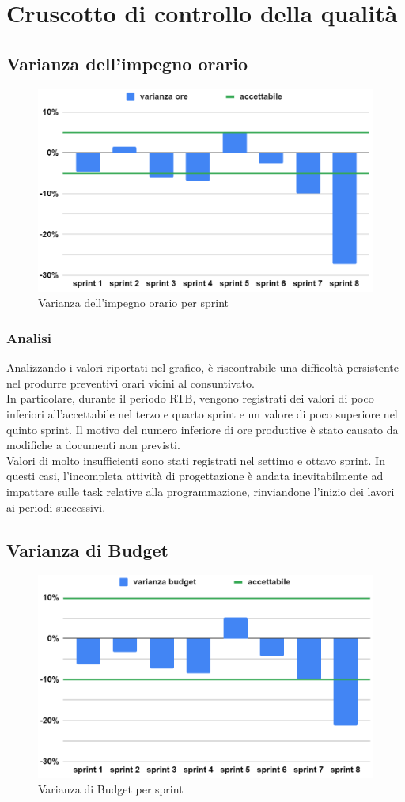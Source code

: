 \chapter{Cruscotto di controllo della qualità} \label{sec:cruscotto}

\section{Varianza dell'impegno orario}
\begin{figure}[H]
    \centering
    \includegraphics[width=0.8\linewidth]{VarOre.png}
    \caption{Varianza dell'impegno orario per sprint}
\end{figure}
\subsection{Analisi}
Analizzando i valori riportati nel grafico, è riscontrabile una difficoltà persistente nel produrre preventivi orari vicini al consuntivato.\\
In particolare, durante il periodo RTB, vengono registrati dei valori di poco inferiori all'accettabile nel terzo e quarto sprint e un valore di poco superiore nel quinto sprint. Il motivo del numero inferiore di ore produttive è stato causato da modifiche a documenti non previsti.\\
Valori di molto insufficienti sono stati registrati nel settimo e ottavo sprint. In questi casi, l'incompleta attività di progettazione è andata inevitabilmente ad impattare sulle task relative alla programmazione, rinviandone l'inizio dei lavori ai periodi successivi.

\section{Varianza di Budget}
\begin{figure}[H]
    \centering
    \includegraphics[width=0.8\linewidth]{VarBud.png}
    \caption{Varianza di Budget per sprint}
\end{figure}
